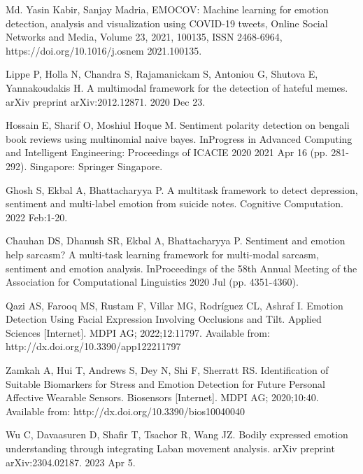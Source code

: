 \documentclass[runningheads]{llncs}
\begin{document}
%
%
%
% 
% 
%
\begin{thebibliography}{8}
Md. Yasin Kabir, Sanjay Madria, EMOCOV: Machine learning for emotion detection, analysis and visualization using COVID-19 tweets, Online Social Networks and Media, Volume 23, 2021, 100135, ISSN 2468-6964, https://doi.org/10.1016/j.osnem 2021.100135.

Lippe P, Holla N, Chandra S, Rajamanickam S, Antoniou G, Shutova E, Yannakoudakis H. A multimodal framework for the detection of hateful memes. arXiv preprint arXiv:2012.12871. 2020 Dec 23.

Hossain E, Sharif O, Moshiul Hoque M. Sentiment polarity detection on bengali book reviews using multinomial naive bayes. InProgress in Advanced Computing and Intelligent Engineering: Proceedings of ICACIE 2020 2021 Apr 16 (pp. 281-292). Singapore: Springer Singapore.

Ghosh S, Ekbal A, Bhattacharyya P. A multitask framework to detect depression, sentiment and multi-label emotion from suicide notes. Cognitive Computation. 2022 Feb:1-20.

Chauhan DS, Dhanush SR, Ekbal A, Bhattacharyya P. Sentiment and emotion help sarcasm? A multi-task learning framework for multi-modal sarcasm, sentiment and emotion analysis. InProceedings of the 58th Annual Meeting of the Association for Computational Linguistics 2020 Jul (pp. 4351-4360).

Qazi AS, Farooq MS, Rustam F, Villar MG, Rodríguez CL, Ashraf I. Emotion Detection Using Facial Expression Involving Occlusions and Tilt. Applied Sciences [Internet]. MDPI AG; 2022;12:11797. Available from: http://dx.doi.org/10.3390/app122211797

Zamkah A, Hui T, Andrews S, Dey N, Shi F, Sherratt RS. Identification of Suitable Biomarkers for Stress and Emotion Detection for Future Personal Affective Wearable Sensors. Biosensors [Internet]. MDPI AG; 2020;10:40. Available from: http://dx.doi.org/10.3390/bios10040040

Wu C, Davaasuren D, Shafir T, Tsachor R, Wang JZ. Bodily expressed emotion understanding through integrating Laban movement analysis. arXiv preprint arXiv:2304.02187. 2023 Apr 5.


\end{thebibliography}
\end{document}
